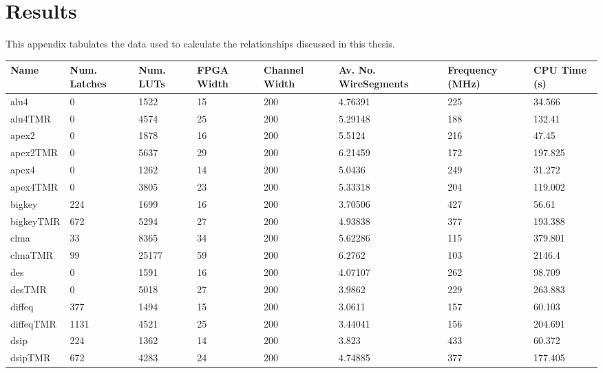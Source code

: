 \documentclass[12pt,final,oneside]{dwThesis} %
\begin{document}
   \appendix
   \chapter{Results}
   This appendix tabulates the data used to calculate the relationships discussed in this thesis.
   \begin{table}
      \footnotesize
      \begin{adjustwidth}{-1cm}{-1.2cm}
         \begin{tabularx}{1.1\textwidth}{llllp{1.5cm}p{2.2cm}p{1.5cm}X}
            \toprule
            Name & Num. Latches & Num. LUTs & FPGA Width & Channel Width & Av. No. Wire\newline Segments & Frequency (MHz) & CPU Time (s)\\\midrule
            alu4 & 0 & 1522 & 15 & 200 & 4.76391 &225 & 34.566\\
            alu4TMR & 0 & 4574 & 25 & 200 & 5.29148 &188 & 132.41\\\midrule
            apex2 & 0 & 1878 & 16 & 200 & 5.5124 &216 & 47.45\\
            apex2TMR & 0 & 5637 & 29 & 200 & 6.21459 &172 & 197.825\\\midrule
            apex4 & 0 & 1262 & 14 & 200 & 5.0436 &249 & 31.272\\
            apex4TMR & 0 & 3805 & 23 & 200 & 5.33318 &204 & 119.002\\\midrule
            bigkey & 224 & 1699 & 16 & 200 & 3.70506 &427 & 56.61\\
            bigkeyTMR & 672 & 5294 & 27 & 200 & 4.93838 &377 & 193.388\\\midrule
            clma & 33 & 8365 & 34 & 200 & 5.62286 &115 & 379.801\\
            clmaTMR & 99 & 25177 & 59 & 200 & 6.2762 &103 & 2146.4\\\midrule
            des & 0 & 1591 & 16 & 200 & 4.07107 &262 & 98.709\\
            desTMR & 0 & 5018 & 27 & 200 & 3.9862 &229 & 263.883\\\midrule
            diffeq & 377 & 1494 & 15 & 200 & 3.0611 &157 & 60.103\\
            diffeqTMR & 1131 & 4521 & 25 & 200 & 3.44041 &156 & 204.691\\\midrule
            dsip & 224 & 1362 & 14 & 200 & 3.823 &433 & 60.372\\
            dsipTMR & 672 & 4283 & 24 & 200 & 4.74885 &377 & 177.405\\\midrule

\end{tabularx}
\end{adjustwidth}
\end{table}
\end{document}
